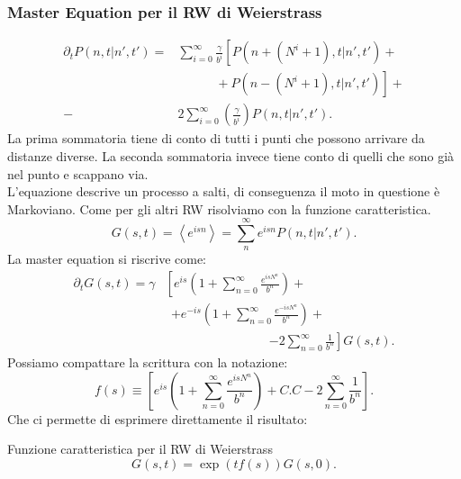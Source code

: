 \subsubsection{Master Equation per il RW di Weierstrass}%
\label{subsub:Master Equation per il RW di Weierstrass}
\[\begin{aligned}
    \partial_{t}P\left(n,t|n',t'\right) = &\sum_{i=0}^{\infty} 
    \frac{\gamma}{b^{i}} \left[P\left(n+(N^{i}+1) ,t|n',t'\right) \right. + \\
		    & \qquad \quad + \left. P\left(n-(N^{i}+1) ,t|n',t'\right)\right] + \\
		     - &2 \sum_{i=0}^{\infty} \left(\frac{\gamma}{b^{i}}\right) P\left(n,t|n',t'\right)
.\end{aligned}\]
La prima sommatoria tiene di conto di tutti i punti che possono arrivare da distanze diverse. La seconda sommatoria invece tiene conto di quelli che sono già nel punto e scappano via.\\
L'equazione descrive un processo a salti, di conseguenza il moto in questione è Markoviano. Come per gli altri RW risolviamo con la funzione caratteristica.
\[
    G(s,t) = \left<e^{isn}\right> = \sum_{n}^{\infty} e^{isn}P(n,t|n',t') 
.\] 
La master equation si riscrive come:
\[\begin{aligned}
    \partial_{t}G(s,t) = \gamma &\left[e^{is}\left( 1 + \sum_{n=0}^{\infty} \frac{e^{isN^{n}}}{b^{n}} \right) + \right.\\  
				& \ \ \left. + e^{-is}\left( 1 + \sum_{n=0}^{\infty} \frac{e^{-isN^{n}}}{b^{n}} \right) + \right.\\
				& \qquad \qquad \qquad \qquad \ \left.- 2 \sum_{n=0}^{\infty} \frac{1}{b^n} \right]G(s,t) 
.\end{aligned}\]
Possiamo compattare la scrittura con la notazione:
\[
    f(s) \equiv \left[e^{is}\left( 1 + \sum_{n=0}^{\infty} \frac{e^{isN^{n}}}{b^{n}} \right) + C.C - 2 \sum_{n=0}^{\infty} \frac{1}{b^n} \right]
.\] 
Che ci permette di esprimere direttamente il risultato:
\begin{bluebox}{Funzione caratteristica per il RW di Weierstrass}
\[
    G(s,t) = \exp\left(tf(s)\right)G(s,0) 
.\]     
\end{bluebox}
\noindent

